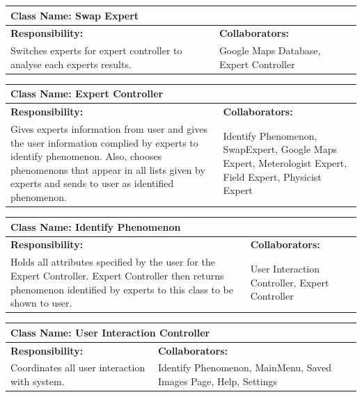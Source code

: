 \documentclass[]{article}
\begin{document}
	\begin{table}[ht]
		\centering
		\begin{tabular}{|p{5cm}|p{5cm}|}
		\hline 
		 \multicolumn{2}{|l|}{\textbf{Class Name: Swap Expert}} \\
		\hline
		\textbf{Responsibility:} & \textbf{Collaborators:} \\
		\hline
		Switches experts for expert controller to analyse each experts results. \vspace{1in} & Google Maps Database, Expert Controller\\
		\hline
		\end{tabular}
	\end{table}

	\begin{table}[ht]
		\centering
		\begin{tabular}{|p{5cm}|p{5cm}|}
		\hline 
		 \multicolumn{2}{|l|}{\textbf{Class Name: Expert Controller}} \\
		\hline
		\textbf{Responsibility:} & \textbf{Collaborators:} \\
		\hline
		Gives experts information from user and gives the user information complied by experts to identify phenomenon. Also, chooses phenomenons that appear in all lists given by experts and sends to user as identified phenomenon. \vspace{1in} & Identify Phenomenon, SwapExpert, Google Maps Expert, Meterologist Expert, Field Expert, Physicist Expert\\
		\hline
		\end{tabular}
	\end{table}
	
	\begin{table}[ht]
		\centering
		\begin{tabular}{|p{5cm}|p{5cm}|}
		\hline 
		 \multicolumn{2}{|l|}{\textbf{Class Name: Identify Phenomenon}} \\
		\hline
		\textbf{Responsibility:} & \textbf{Collaborators:} \\
		\hline
		Holds all attributes specified by the user for the Expert Controller. Expert Controller then returns phenomenon identified by experts to this class to be shown to user. \vspace{1in} & User Interaction Controller, Expert Controller\\
		\hline
		\end{tabular}
	\end{table}

	\begin{table}[ht]
		\centering
		\begin{tabular}{|p{5cm}|p{5cm}|}
		\hline 
		 \multicolumn{2}{|l|}{\textbf{Class Name: User Interaction Controller}} \\
		\hline
		\textbf{Responsibility:} & \textbf{Collaborators:} \\
		\hline
		 Coordinates all user interaction with system. \vspace{1in} & Identify Phenomenon, MainMenu, Saved Images Page, Help, Settings \\
		\hline
		\end{tabular}
	\end{table}
\end{document}
